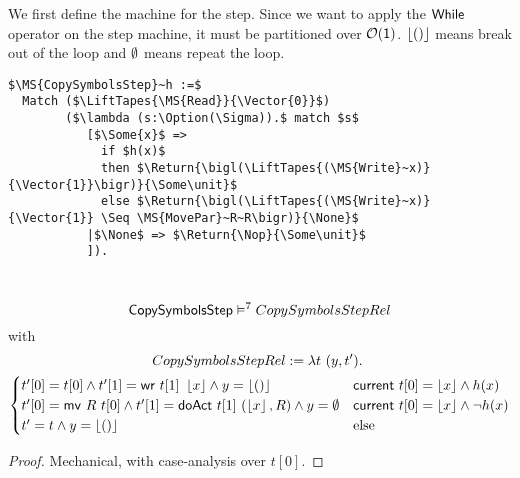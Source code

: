 We first define the machine for the step.  Since we want to apply the $\mathsf{While}$ operator on the step machine, it must be partitioned over
$\mathcal{O}(\mathsf{1})$.  $\left\lfloor {\ensuremath{\mathsf{()}}} \right\rfloor$ means break out of the loop and $\emptyset$ means repeat the loop.
\begin{definition}[$\MS{CopySymbolsStep}$]
  \label{CopySymbols_Step}
\begin{lstlisting}[style=semicoqstyle]
$\MS{CopySymbolsStep}~h :=$
  Match ($\LiftTapes{\MS{Read}}{\Vector{0}}$)
        ($\lambda (s:\Option(\Sigma)).$ match $s$
           [$\Some{x}$ =>
             if $h(x)$
             then $\Return{\bigl(\LiftTapes{(\MS{Write}~x)}{\Vector{1}}\bigr)}{\Some\unit}$ 
             else $\Return{\bigl(\LiftTapes{(\MS{Write}~x)}{\Vector{1}} \Seq \MS{MovePar}~R~R\bigr)}{\None}$ 
           |$\None$ => $\Return{\Nop}{\Some\unit}$ 
           ]).
\end{lstlisting}
\end{definition}

\begin{lemma}
  \label{lem:CopySymbols_Step_Sem}
  ~
  \[
    \mathsf{CopySymbolsStep} \mathrel{\vDash^{7}} CopySymbolsStepRel
  \]
  with
  \begin{multline*}
    CopySymbolsStepRel := \lambda t~(y, t').~\\
    \begin{cases}
      t'[0] = t[0]           \land t'[1]=\mathsf{wr}~t[1]~\left\lfloor {x} \right\rfloor         \land y=\left\lfloor {\ensuremath{\mathsf{()}}} \right\rfloor & \mathsf{current}~t[0]=\left\lfloor {x} \right\rfloor \land       h(x) \\
      t'[0] = \mathsf{mv}~R~t[0] \land t'[1]=\mathsf{doAct}~t[1]~(\left\lfloor {x} \right\rfloor, R) \land y=\emptyset      & \mathsf{current}~t[0]=\left\lfloor {x} \right\rfloor \land \lnot h(x) \\
      t' = t \land y=\left\lfloor {\ensuremath{\mathsf{()}}} \right\rfloor                                                           & \text{else}
    \end{cases}
  \end{multline*}
\end{lemma}
\begin{proof}
  Mechanical, with case-analysis over $t[0]$.
\end{proof}

